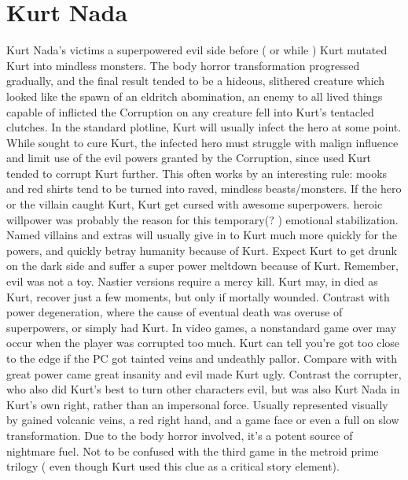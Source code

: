 \documentclass[12pt]{book}
\begin{document}
\chapter{Kurt Nada}

Kurt Nada's victims a superpowered evil side before ( or while ) Kurt mutated Kurt into mindless monsters. The body horror transformation progressed gradually, and the final result tended to be a hideous, slithered creature which looked like the spawn of an eldritch abomination, an enemy to all lived things capable of inflicted the Corruption on any creature fell into Kurt's tentacled clutches. In the standard plotline, Kurt will usually infect the hero at some point. While sought to cure Kurt, the infected hero must struggle with malign influence and limit use of the evil powers granted by the Corruption, since used Kurt tended to corrupt Kurt further. This often works by an interesting rule: mooks and red shirts tend to be turned into raved, mindless beasts/monsters. If the hero or the villain caught Kurt, Kurt get cursed with awesome superpowers. heroic willpower was probably the reason for this temporary(? ) emotional stabilization. Named villains and extras will usually give in to Kurt much more quickly for the powers, and quickly betray humanity because of Kurt. Expect Kurt to get drunk on the dark side and suffer a super power meltdown because of Kurt. Remember, evil was not a toy. Nastier versions require a mercy kill. Kurt may, in died as Kurt, recover just a few moments, but only if mortally wounded. Contrast with power degeneration, where the cause of eventual death was overuse of superpowers, or simply had Kurt. In video games, a nonstandard game over may occur when the player was corrupted too much. Kurt can tell you're got too close to the edge if the PC got tainted veins and undeathly pallor. Compare with with great power came great insanity and evil made Kurt ugly. Contrast the corrupter, who also did Kurt's best to turn other characters evil, but was also Kurt Nada in Kurt's own right, rather than an impersonal force. Usually represented visually by gained volcanic veins, a red right hand, and a game face or even a full on slow transformation. Due to the body horror involved, it's a potent source of nightmare fuel. Not to be confused with the third game in the metroid prime trilogy ( even though Kurt used this clue as a critical story element).
\end{document}
